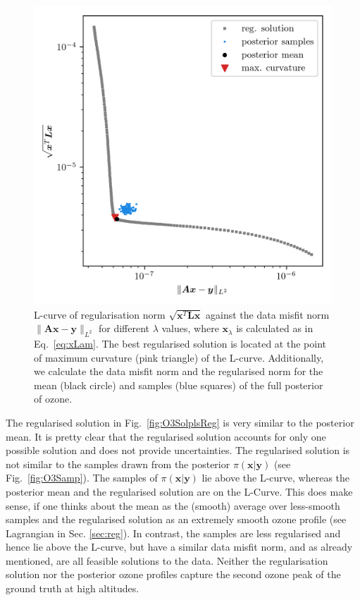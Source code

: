 \begin{figure}[ht!]
	\centering
	\includegraphics{LCurvePhD.png}
	\caption[Plot of the L-curve to find the regularised solution.]{L-curve of regularisation norm $\sqrt{\bm{x}^T\bm{Lx}}$ against the data misfit norm $\lVert \bm{A}\bm{x} - \bm{y} \rVert_{L^2}$ for different $\lambda$ values, where $\bm{x}_{\lambda}$ is calculated as in Eq.~\ref{eq:xLam}. The best regularised solution is located at the point of maximum curvature (pink triangle) of the L-curve. Additionally, we calculate the data misfit norm and the regularised norm for the mean (black circle) and samples (blue squares) of the full posterior of ozone.}
	\label{fig:LCurve}
\end{figure}

The regularised solution in Fig.~\ref{fig:O3SolplsReg} is very similar to the posterior mean.
It is pretty clear that the regularised solution accounts for only one possible solution and does not provide uncertainties. The regularised solution is not similar to the samples drawn from the posterior $\pi(\bm{x}| \bm{y})$ (see Fig.~\ref{fig:O3Samp}).
The samples of $\pi(\bm{x}| \bm{y})$ lie above the L-curve, whereas the posterior mean and the regularised solution are on the L-Curve.
This does make sense, if one thinks about the mean as the (smooth) average over less-smooth samples and the regularised solution as an extremely smooth ozone profile (see Lagrangian in Sec. \ref{sec:reg}).
In contrast, the samples are less regularised and hence lie above the L-curve, but have a similar data misfit norm, and as already mentioned, are all feasible solutions to the data.
Neither the regularisation solution nor the posterior ozone profiles capture the second ozone peak of the ground truth at high altitudes.

